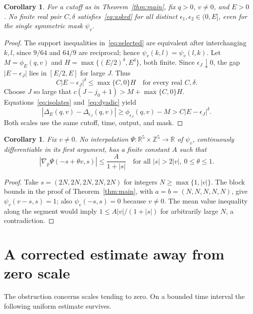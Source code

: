 \documentclass[11pt]{article}
\newtheorem{corollary}[theorem]{Corollary}
\newcommand{\R}{\mathbb R}
\newcommand{\Z}{\mathbb Z}
\begin{document}
\begin{corollary}\label{cor:interval}
For a cutoff as in Theorem~\ref{thm:main}, fix $q>0$, $v\ne0$,
and $E>0$. No finite real pair $C,\delta$
satisfies~\eqref{eq:asked} for all distinct
$\epsilon_1,\epsilon_2\in(0,E]$, even for the single symmetric mask $\psi_v$.
\end{corollary}
\begin{proof}
The support inequalities in~\eqref{eq:selected} are equivalent after
interchanging $k,l$, since $9/64$ and $64/9$ are reciprocal; hence
$\psi_v(k,l)=\psi_v(l,k)$. Let $M=\phi_E(q,v)$ and
$H=\max\{(E/2)^\delta,E^\delta\}$, both finite.
Since $\epsilon_J\downarrow0$, the gap $|E-\epsilon_J|$ lies in
$[E/2,E]$ for large $J$. Thus
\[
 C|E-\epsilon_J|^\delta\le\max\{C,0\}H
 \quad\text{for every real }C,\delta.
\]
Choose $J$ so large that
$c(J-j_0+1)>M+\max\{C,0\}H$. Equations~\eqref{eq:isolates}
and~\eqref{eq:dyadic} yield
\[
 |\Delta_E(q,v)-\Delta_{\epsilon_J}(q,v)|
 \ge\phi_{\epsilon_J}(q,v)-M
 >C|E-\epsilon_J|^\delta.
\]
Both scales use the same cutoff, time, output, and mask.
\end{proof}

\begin{corollary}\label{cor:regularity}
Fix $v\ne0$. No interpolation $\Psi:\R^5\times\Z^5\to\R$
of $\psi_v$, continuously differentiable in its first argument,
has a finite constant $A$ such that
\[
 |\nabla_p\Psi(-s+\theta v,s)|\le \frac{A}{1+|s|}
 \quad\text{for all }|s|>2|v|,\ 0\le\theta\le1.
\]
\end{corollary}
\begin{proof}
Take $s=(2N,2N,2N,2N,2N)$ for integers $N\ge\max\{1,|v|\}$.
The block bounds in the proof of Theorem~\ref{thm:main}, with
$a=b=(N,N,N,N,N)$, give $\psi_v(v-s,s)=1$;
also $\psi_v(-s,s)=0$ because $v\ne0$.
The mean value inequality along the segment would imply
$1\le A|v|/(1+|s|)$ for arbitrarily large $N$, a contradiction.
\end{proof}

\section{A corrected estimate away from zero scale}\label{sec:correction}

The obstruction concerns scales tending to zero. On a bounded time
interval the following uniform estimate survives.
\end{document}
